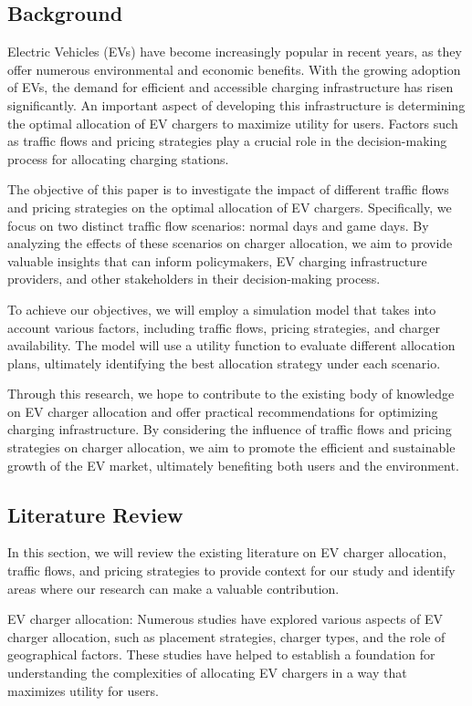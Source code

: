 
\subsection{Background}
Electric Vehicles (EVs) have become increasingly popular in recent years, as they offer numerous environmental and economic benefits. With the growing adoption of EVs, the demand for efficient and accessible charging infrastructure has risen significantly. An important aspect of developing this infrastructure is determining the optimal allocation of EV chargers to maximize utility for users. Factors such as traffic flows and pricing strategies play a crucial role in the decision-making process for allocating charging stations.

The objective of this paper is to investigate the impact of different traffic flows and pricing strategies on the optimal allocation of EV chargers. Specifically, we focus on two distinct traffic flow scenarios: normal days and game days. By analyzing the effects of these scenarios on charger allocation, we aim to provide valuable insights that can inform policymakers, EV charging infrastructure providers, and other stakeholders in their decision-making process.

To achieve our objectives, we will employ a simulation model that takes into account various factors, including traffic flows, pricing strategies, and charger availability. The model will use a utility function to evaluate different allocation plans, ultimately identifying the best allocation strategy under each scenario.

Through this research, we hope to contribute to the existing body of knowledge on EV charger allocation and offer practical recommendations for optimizing charging infrastructure. By considering the influence of traffic flows and pricing strategies on charger allocation, we aim to promote the efficient and sustainable growth of the EV market, ultimately benefiting both users and the environment.

\subsection{Literature Review}

In this section, we will review the existing literature on EV charger allocation, traffic flows, and pricing strategies to provide context for our study and identify areas where our research can make a valuable contribution.

EV charger allocation: Numerous studies have explored various aspects of EV charger allocation, such as placement strategies, charger types, and the role of geographical factors. These studies have helped to establish a foundation for understanding the complexities of allocating EV chargers in a way that maximizes utility for users.

